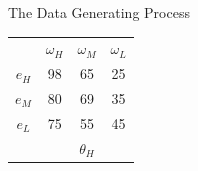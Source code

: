 \documentclass[aspectratio=169]{beamer}
\begin{document}
\begin{frame}{The Data Generating Process}
\begin{tabular}{ c|c|c|c|}
  \multicolumn{1}{c}{} & \multicolumn{1}{c}{$\omega_H$} & \multicolumn{1}{c}{$\omega_M$} & \multicolumn{1}{c}{$\omega_L$}\\
  \cline{2-4}
  $e_H$ & \cellcolor{blue!25}98 & 65 & 25 \\
  \cline{2-4}
  $e_M$ & 80 & \cellcolor{blue!25}69 & 35 \\
  \cline{2-4}
  $e_L$ & 75 & 55 & \cellcolor{blue!25}45 \\
  \cline{2-4}
  \multicolumn{1}{c}{} & \multicolumn{1}{c}{} & \multicolumn{1}{c}{$\theta_H$} & \multicolumn{1}{c}{}\\
\end{tabular}

\begin{center}
  \end{center}
    
\end{frame}
\end{document}
